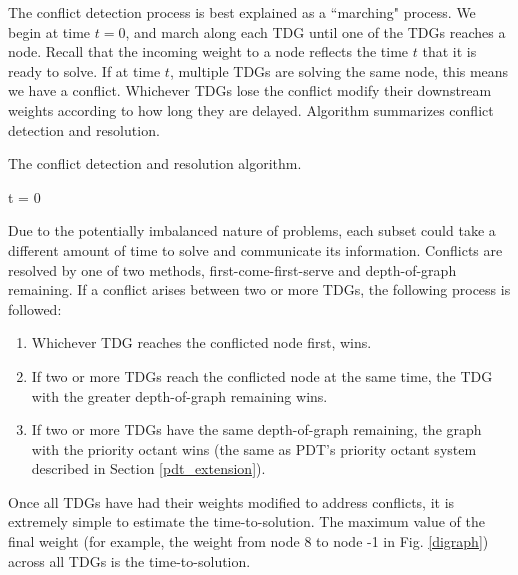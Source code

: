 \documentclass[11pt, letterpaper,titlepage,oneside]{article}
\begin{document}
The conflict detection process is best explained as a ``marching" process. We begin at time $t = 0$, and march along each TDG until one of the TDGs reaches a node. Recall that the incoming weight to a node reflects the time $t$ that it is ready to solve. If at time $t$, multiple TDGs are solving the same node, this means we have a conflict. Whichever TDGs lose the conflict modify their downstream weights according to how long they are delayed. Algorithm \label{conflict_algorithm} summarizes conflict detection and resolution.
\begin{algorithm}[H]
\caption{The conflict detection and resolution algorithm.}
\label{conflict_algorithm}
\begin{algorithmic}
\STATE t = 0
\ELSE
\ENDIF
{}
\ENDWHILE
\end{algorithmic}
\end{algorithm}
Due to the potentially imbalanced nature of problems, each subset could take a different amount of time to solve and communicate its information.  Conflicts are resolved by one of two methods, first-come-first-serve and depth-of-graph remaining. If a conflict arises between two or more TDGs, the following process is followed:
\begin{enumerate}
	\item Whichever TDG reaches the conflicted node first, wins.
	\item If two or more TDGs reach the conflicted node at the same time, the TDG with the greater depth-of-graph remaining wins.
	\item If two or more TDGs have the same depth-of-graph remaining, the graph with the priority octant wins (the same as PDT's priority octant system described in Section \ref{pdt_extension}).
\end{enumerate}

Once all TDGs have had their weights modified to address conflicts, it is extremely simple to estimate the time-to-solution. The maximum value of the final weight (for example, the weight from node 8 to node -1 in Fig. \ref{digraph}) across all TDGs is the time-to-solution. 
\end{document}
